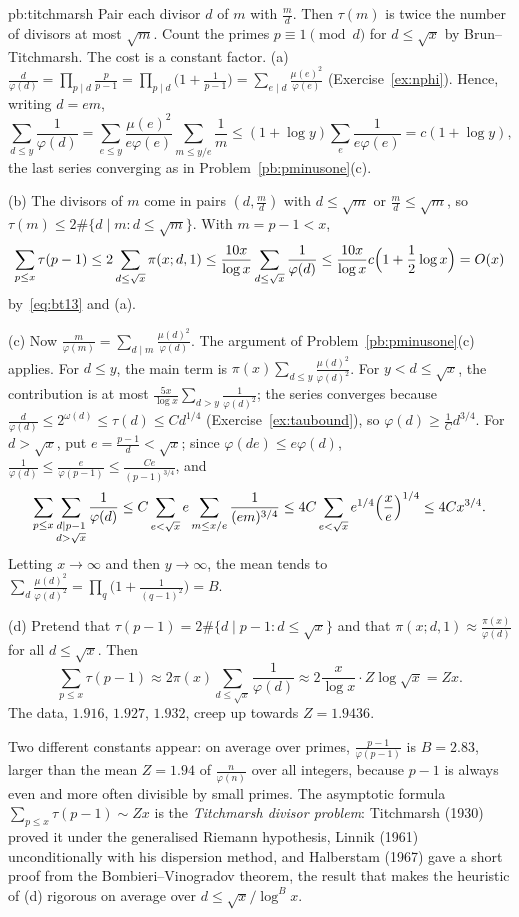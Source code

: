 \begin{solution}{pb:titchmarsh}
\idea Pair each divisor $d$ of $m$ with $\frac md$. Then $\tau(m)$ is twice the number of divisors at most $\sqrt m$. Count the primes $p\equiv1\pmod d$ for $d\le\sqrt x$ by Brun--Titchmarsh. The cost is a constant factor.
\writeup (a) $\frac d{\varphi(d)}=\prod_{p\mid d}\frac p{p-1}=\prod_{p\mid d}\bigl(1+\frac1{p-1}\bigr)=\sum_{e\mid d}\frac{\mu(e)^2}{\varphi(e)}$ (Exercise~\ref{ex:nphi}). Hence, writing $d=em$,
\[
\sum_{d\le y}\frac1{\varphi(d)}=\sum_{e\le y}\frac{\mu(e)^2}{e\varphi(e)}\sum_{m\le y/e}\frac1m\le(1+\log y)\sum_e\frac1{e\varphi(e)}=c(1+\log y),
\]
the last series converging as in Problem~\ref{pb:pminusone}(c).

(b) The divisors of $m$ come in pairs $(d,\frac md)$ with $d\le\sqrt m$ or $\frac md\le\sqrt m$, so $\tau(m)\le2\#\{d\mid m:d\le\sqrt m\}$. With $m=p-1<x$,
\[
\sum_{p\le x}\tau(p-1)\le2\sum_{d\le\sqrt x}\pi(x;d,1)\le\frac{10x}{\log x}\sum_{d\le\sqrt x}\frac1{\varphi(d)}\le\frac{10x}{\log x}c\Bigl(1+\frac12\log x\Bigr)=O(x)
\]
by~\eqref{eq:bt13} and (a).

(c) Now $\frac m{\varphi(m)}=\sum_{d\mid m}\frac{\mu(d)^2}{\varphi(d)}$. The argument of Problem~\ref{pb:pminusone}(c) applies. For $d\le y$, the main term is $\pi(x)\sum_{d\le y}\frac{\mu(d)^2}{\varphi(d)^2}$.
For $y<d\le\sqrt x$, the contribution is at most $\frac{5x}{\log x}\sum_{d>y}\frac1{\varphi(d)^2}$; the series converges because $\frac d{\varphi(d)}\le2^{\omega(d)}\le\tau(d)\le C d^{1/4}$
(Exercise~\ref{ex:taubound}), so $\varphi(d)\ge\frac1Cd^{3/4}$. For $d>\sqrt x$, put $e=\frac{p-1}d<\sqrt x$; since $\varphi(de)\le e\varphi(d)$, $\frac1{\varphi(d)}\le\frac e{\varphi(p-1)}\le\frac{Ce}{(p-1)^{3/4}}$, and
\[
\sum_{p\le x}\sum_{\substack{d\mid p-1\\d>\sqrt x}}\frac1{\varphi(d)}\le C\sum_{e<\sqrt x}e\sum_{m\le x/e}\frac1{(em)^{3/4}}\le4C\sum_{e<\sqrt x}e^{1/4}\Bigl(\frac xe\Bigr)^{1/4}\le4Cx^{3/4}.
\]
Letting $x\to\infty$ and then $y\to\infty$, the mean tends to $\sum_d\frac{\mu(d)^2}{\varphi(d)^2}=\prod_q\bigl(1+\frac1{(q-1)^2}\bigr)=B$.

(d) Pretend that $\tau(p-1)=2\#\{d\mid p-1:d\le\sqrt x\}$ and that $\pi(x;d,1)\approx\frac{\pi(x)}{\varphi(d)}$ for all $d\le\sqrt x$. Then
\[
\sum_{p\le x}\tau(p-1)\approx2\pi(x)\sum_{d\le\sqrt x}\frac1{\varphi(d)}\approx2\frac x{\log x}\cdot Z\log\sqrt x=Zx.
\]
The data, $1.916$, $1.927$, $1.932$, creep up towards $Z=1.9436$.

\leads Two different constants appear: on average over primes, $\frac{p-1}{\varphi(p-1)}$ is $B=2.83$, larger than the mean $Z=1.94$ of $\frac n{\varphi(n)}$ over all integers, because $p-1$ is
always even and more often divisible by small primes. The asymptotic formula $\sum_{p\le x}\tau(p-1)\sim Zx$ is the \emph{Titchmarsh divisor problem}: Titchmarsh (1930) proved it under the
generalised Riemann hypothesis, Linnik (1961) unconditionally with his dispersion method, and Halberstam (1967) gave a short proof from the Bombieri--Vinogradov theorem, the result that
makes the heuristic of (d) rigorous on average over $d\le\sqrt x/\log^Bx$.
\end{solution}

